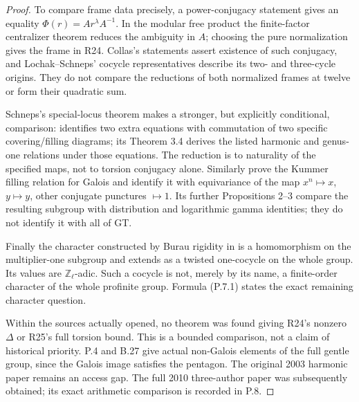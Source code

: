 \begin{proof}
To compare frame data precisely, a power-conjugacy
statement gives an equality
$\Phi(r)=A r^{\lambda}A^{-1}$. In the modular
free product the finite-factor centralizer theorem
reduces the ambiguity in $A$; choosing the pure
normalization gives the frame in R24. Collas's
statements assert existence of such conjugacy, and
Lochak--Schneps' cocycle representatives describe its
two- and three-cycle origins. They do not compare
the reductions of both normalized frames at twelve
or form their quadratic sum.

Schneps's special-locus theorem makes a stronger,
but explicitly conditional, comparison:
\cite[Theorem 3.1]{ROOT_SchnepsSpecial2006} identifies
two extra equations with commutation of two specific
covering/filling diagrams; its Theorem 3.4 derives
the listed harmonic and genus-one relations under
those equations. The reduction is to naturality
of the specified maps, not to torsion conjugacy alone.
Similarly \cite[Theorem 1 and Proposition 1]{ROOT_Ihara2000}
prove the Kummer filling relation for Galois and
identify it with equivariance of the map
$x^n\mapsto x$, $y\mapsto y$, other conjugate
punctures $\mapsto1$. Its further Propositions 2--3
compare the resulting subgroup with distribution
and logarithmic gamma identities; they do not
identify it with all of GT.

Finally the character constructed by Burau rigidity
in \cite[\S4]{ROOT_Marin2008} is a homomorphism on
the multiplier-one subgroup and extends as a twisted
one-cocycle on the whole group. Its values are
$\mathbb Z_\ell$-adic. Such a cocycle is not,
merely by its name, a finite-order character of
the whole profinite group. Formula (P.7.1) states
the exact remaining character question.

Within the sources actually opened, no theorem was
found giving R24's nonzero $\Delta$ or R25's full
torsion bound. This is a bounded comparison, not
a claim of historical priority. P.4 and B.27 give
actual non-Galois elements of the full gentle
group, since the Galois image satisfies the pentagon.
The original 2003 harmonic paper remains an access gap.
The full 2010 three-author paper was subsequently obtained;
its exact arithmetic comparison is recorded in P.8.
\end{proof}

